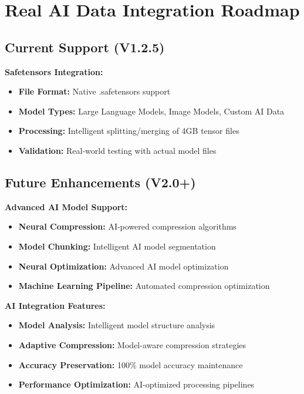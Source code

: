 \documentclass[12pt,a4paper]{article}
\begin{document}
\section{Real AI Data Integration Roadmap}

\subsection{Current Support (V1.2.5)}

\textbf{Safetensors Integration:}
\begin{itemize}
    \item \textbf{File Format:} Native .safetensors support
    \item \textbf{Model Types:} Large Language Models, Image Models, Custom AI Data
    \item \textbf{Processing:} Intelligent splitting/merging of 4GB tensor files
    \item \textbf{Validation:} Real-world testing with actual model files
\end{itemize}

\subsection{Future Enhancements (V2.0+)}

\textbf{Advanced AI Model Support:}
\begin{itemize}
    \item \textbf{Neural Compression:} AI-powered compression algorithms
    \item \textbf{Model Chunking:} Intelligent AI model segmentation
    \item \textbf{Neural Optimization:} Advanced AI model optimization
    \item \textbf{Machine Learning Pipeline:} Automated compression optimization
\end{itemize}

\textbf{AI Integration Features:}
\begin{itemize}
    \item \textbf{Model Analysis:} Intelligent model structure analysis
    \item \textbf{Adaptive Compression:} Model-aware compression strategies
    \item \textbf{Accuracy Preservation:} 100\% model accuracy maintenance
    \item \textbf{Performance Optimization:} AI-optimized processing pipelines
\end{itemize}
\end{document}

